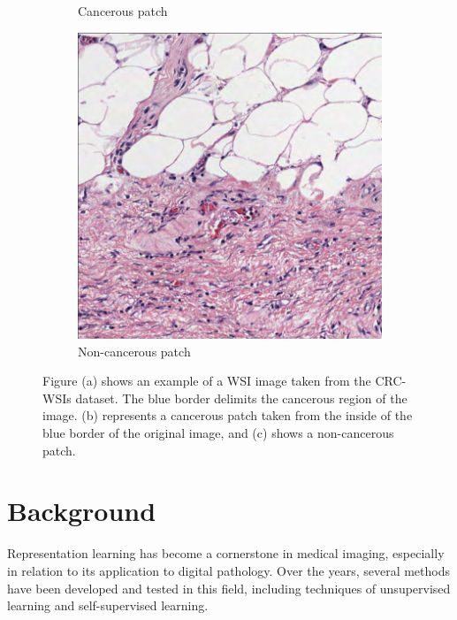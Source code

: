 \documentclass[peerreview]{IEEEtran}
\begin{document}
\begin{figure}
\begin{subfigure}[b]{0.26\textwidth}
        \caption{Cancerous patch}
        \label{fig:ncpatch}
    \end{subfigure}
    \hfill
    \begin{subfigure}[b]{0.26\textwidth}
        \centering
        \includegraphics[width=\textwidth]{figure/ncpatch.jpg}
        \caption{Non-cancerous patch}
        \label{fig:cpatch}
    \end{subfigure}
    \caption{\small Figure (a) shows an example of a WSI image taken from the CRC-WSIs dataset. The blue border delimits the cancerous region of the image. (b) represents a cancerous patch taken from the inside of the blue border of the original image, and (c) shows a non-cancerous patch.}
    \label{fig:wsiexample}
\end{figure}

\section{Background}
Representation learning has become a cornerstone in medical imaging, especially in relation to its application to digital pathology. Over the years, several methods have been developed and tested in this field, including techniques of unsupervised learning and self-supervised learning.
\end{document}
